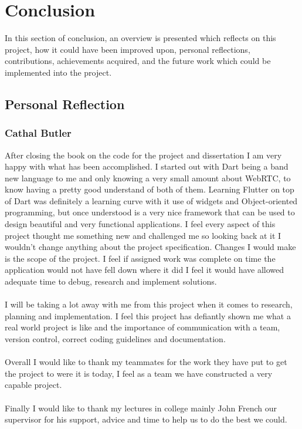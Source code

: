 \chapter{Conclusion}
In this section of conclusion, an overview is presented which reflects on this project, how it could have been improved upon, personal reflections, contributions, achievements acquired, and the future work which could be implemented into the project.

\section{Personal Reflection}
\subsection{Cathal Butler}
After closing the book on the code for the project and dissertation I am very happy with what has been accomplished. I started out with Dart being a band new language to me and only knowing a very small amount about WebRTC, to know having a pretty good understand of both of them. Learning Flutter on top of Dart was definitely a learning curve with it use of widgets and Object-oriented programming, but once understood is a very nice framework that can be used to design beautiful and very functional applications. I feel every aspect of this project thought me something new and challenged me so looking back at it I wouldn't change anything about the project specification. Changes I would make is the scope of the project. I feel if assigned work was complete on time the application would not have fell down where it did I feel it would have allowed adequate time to debug, research and implement solutions.
\\\\ I will be taking a lot away with me from this project when it comes to research, planning and implementation. I feel this project has defiantly shown me what a real world project is like and the importance of communication with a team, version control, correct coding guidelines and documentation.
\\\\ Overall I would like to thank my teammates for the work they have put to get the project to were it is today, I feel as a team we have constructed a very capable project. 
\\\\ Finally I would like to thank my lectures in college mainly John French our supervisor for his support, advice and time to help us to do the best we could.    

